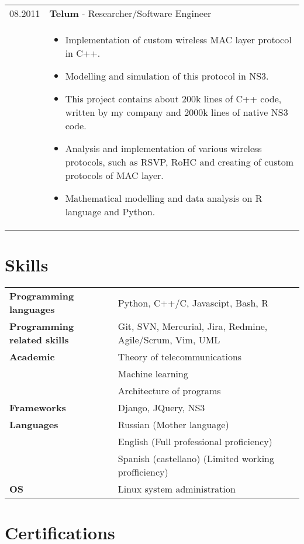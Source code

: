 \documentclass[a4paper, oneside, final]{scrartcl}
\begin{document}
\begin{center}
\begin{tabularx}{0.99\linewidth}{p{1.5cm}p{12.3cm}}
 08.2011 \newline 03.2013 & \textbf{Telum} - Researcher/Software Engineer \\
&   \begin{itemize}
    \item Implementation of custom wireless MAC layer protocol in C++.
    \item Modelling and simulation of this protocol in NS3.
    \item This project contains about 200k lines of C++ code, written by my company and 2000k
    lines of native NS3 code.
    \item Analysis and implementation of various wireless protocols, such as RSVP,
    RoHC and creating of custom protocols of MAC layer.
    \item Mathematical modelling and data analysis on R language and Python.
    \end{itemize}
\\ 
\end{tabularx}

\section{\textbf{Skills}}
\begin{tabular}{ @{} >{\bfseries}l @{\hspace{6ex}} l }
Programming languages & Python, C++/C, Javascipt, Bash, R \\
Programming related skills & Git, SVN, Mercurial, Jira, Redmine, Agile/Scrum, Vim, UML \\
Academic & Theory of telecommunications \\ & Machine learning \\ & Architecture of programs \\
Frameworks & Django, JQuery, NS3 \\
Languages & Russian (Mother language)\\ & English (Full professional proficiency)\\ & Spanish (castellano) (Limited working profficiency)\\
OS & Linux system administration \\
\end{tabular}


\section{\textbf{Certifications}}


\end{center}
\end{document}
